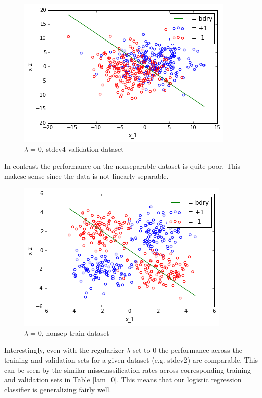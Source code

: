 \documentclass[10pt]{article}
\begin{document}
\begin{figure}
 \centering
 \includegraphics[scale=0.5]{stdev4_val_lam_0.png}
 
 \caption{$\lambda = 0$, stdev4 validation dataset}
 \label{stdev4_val_lam_0}
 \end{figure}
 In contrast the performance on the nonseparable dataset is quite poor. This makese sense since the data is not linearly separable.
\begin{figure}
 \centering
 \includegraphics[scale=0.5]{nonsep_train_lam_0.png}
 
 \caption{$\lambda = 0$, nonsep train dataset}
 \label{nonsep_train_lam_0}
 \end{figure}

 Interestingly, even with the regularizer $\lambda$ set to $0$ the performance across the training and validation sets for a given dataset (e.g. stdev2) are comparable. This can be seen by the similar missclassification rates across corresponding training and validation sets in Table \ref{lam_0}. This means that our logistic regression classifier is generalizing fairly well.
\end{document}
